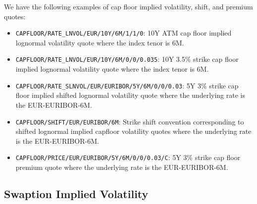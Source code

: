 We have the following examples of cap floor implied volatility, shift, and premium quotes:
\begin{itemize}
\item \lstinline!CAPFLOOR/RATE_LNVOL/EUR/10Y/6M/1/1/0!: 10Y ATM cap floor implied lognormal volatility quote where the index tenor is 6M.
\item \lstinline!CAPFLOOR/RATE_LNVOL/EUR/10Y/6M/0/0/0.035!: 10Y 3.5\% strike cap floor implied lognormal volatility quote where the index tenor is 6M.
\item \lstinline!CAPFLOOR/RATE_SLNVOL/EUR/EURIBOR/5Y/6M/0/0/0.03!: 5Y 3\% strike cap floor implied shifted lognormal volatility quote where the underlying rate is the EUR-EURIBOR-6M.
\item \lstinline!CAPFLOOR/SHIFT/EUR/EURIBOR/6M!: Strike shift convention corresponding to shifted lognormal implied capfloor volatility quotes where the underlying rate is the EUR-EURIBOR-6M.
\item \lstinline!CAPFLOOR/PRICE/EUR/EURIBOR/5Y/6M/0/0/0.03/C!: 5Y 3\% strike cap floor premium quote where the underlying rate is the EUR-EURIBOR-6M.
\end{itemize}

\subsection{Swaption Implied Volatility}
\label{ss:swaptionvolatilitydata}


